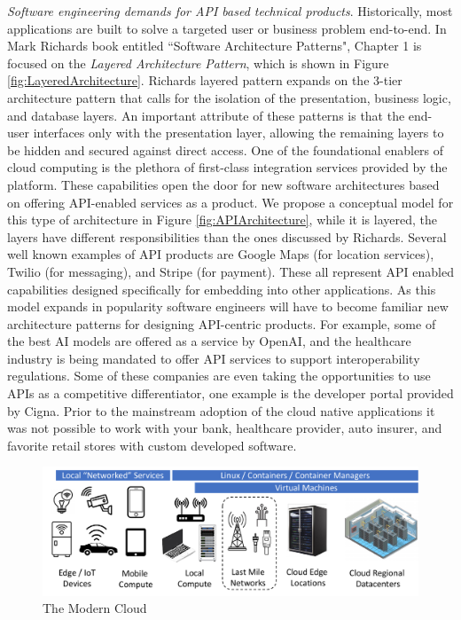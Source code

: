 \documentclass[conference]{IEEEtran}
\begin{document}
\textit{Software engineering demands for API based technical products}.  Historically, most applications are built to solve a targeted user or business problem end-to-end.  In Mark Richards book entitled ``Software Architecture Patterns"\cite{richards2015software}, Chapter 1 is focused on the \textit{Layered Architecture Pattern}, which is shown in Figure \ref{fig:LayeredArchitecture}. Richards layered pattern expands on the 3-tier architecture pattern\cite{aarsten1996patterns} that calls for the isolation of the presentation, business logic, and database layers. An important attribute of these patterns is that the end-user interfaces only with the presentation layer, allowing the remaining layers to be hidden and secured against direct access. One of the foundational enablers of cloud computing is the plethora of first-class integration services provided by the platform. These capabilities open the door for new software architectures based on offering API-enabled services as a product. We propose a conceptual model for this type of architecture in Figure \ref{fig:APIArchitecture}, while it is layered, the layers have different responsibilities than the ones discussed by Richards. Several well known examples of API products are Google Maps (for location services), Twilio (for messaging), and Stripe (for payment). These all represent API enabled capabilities designed specifically for embedding into other applications. As this model expands in popularity software engineers will have to become familiar new architecture patterns for designing API-centric products.  For example, some of the best AI models are offered as a service by OpenAI\cite{OpenAI}, and the healthcare industry is being mandated to offer API services to support interoperability\cite{FHIRAPI} regulations.  Some of these companies are even taking the opportunities to use APIs as a competitive differentiator, one example is the developer portal provided by Cigna\cite{CignaDeveloper}. Prior to the mainstream adoption of the cloud native applications it was not possible to work with your bank, healthcare provider, auto insurer, and favorite retail stores with custom developed software. 


\begin{figure}[t!]
	\includegraphics[width=\textwidth]{images/CloudTopo2.pdf}	
	\caption{The Modern Cloud}
	\label{fig:CloudTopo}
\end{figure}
\end{document}
